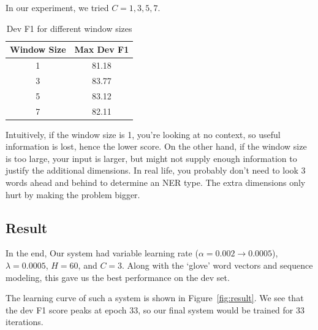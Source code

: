 \documentclass[12pt, twocolumn]{article}
\begin{document}
In our experiment, we tried $C=1,3,5,7$.
\begin{table}[H]
\centering
	\begin{tabular}{|c|c|}
		\hline
		Window Size & Max Dev F1 \\\hline
		1 & 81.18 \\\hline
		3 & 83.77 \\\hline
		5 & 83.12 \\\hline
		7 & 82.11 \\\hline
	\end{tabular}
	\caption{Dev F1 for different window sizes}
\label{tab:window}
\end{table}
Intuitively, if the window size is 1, you're looking at no context, so useful information is lost, hence the lower score. On the other hand, if the window size is too large, your input is larger, but might not supply enough information to justify the additional dimensions. In real life, you probably don't need to look 3 words ahead and behind to determine an NER type. The extra dimensions only hurt by making the problem bigger.
\subsection{Result}
In the end, Our system had variable learning rate ($\alpha = 0.002\rightarrow0.0005$), $\lambda = 0.0005$, $H=60$, and $C=3$. Along with the `glove' word vectors and sequence modeling, this gave us the best performance on the dev set.

The learning curve of such a system is shown in Figure~\ref{fig:result}. We see that the dev F1 score peaks at epoch 33, so our final system would be trained for 33 iterations.
\end{document}
